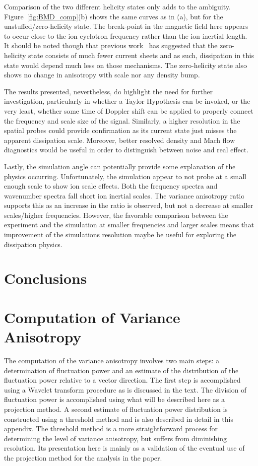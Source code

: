 \documentclass[aip,prl,amsmath,amssymb,reprint,superscriptaddress]{revtex4-1} %
\begin{document}
Comparison of the two different helicity states only adds to the ambiguity. Figure~\ref{fig:BMD_comp}(b) shows the same curves as in (a), but for the unstuffed/zero-helicity state. The break-point in the magnetic field here appears to occur close to the ion cyclotron frequency rather than the ion inertial length. It should be noted though that previous work~\cite{schaffner14b} has suggested that the zero-helicity state consists of much fewer current sheets and as such, dissipation in this state would depend much less on those mechanisms. The zero-helicity state also shows no change in anisotropy with scale nor any density bump.

The results presented, nevertheless, do highlight the need for further investigation, particularly in whether a Taylor Hypothesis can be invoked, or the very least, whether some time of Doppler shift can be applied to properly connect the frequency and scale size of the signal. Similarly, a higher resolution in the spatial probes could provide confirmation as its current state just misses the apparent dissipation scale. Moreover, better resolved density and Mach flow diagnostics would be useful in order to distinguish between noise and real effect.

Lastly, the simulation angle can potentially provide some explanation of the physics occurring. Unfortunately, the simulation appear to not probe at a small enough scale to show ion scale effects. Both the frequency spectra and wavenumber spectra fall short ion inertial scales. The variance anisotropy ratio supports this as an increase in the ratio is observed, but not a decrease at smaller scales/higher frequencies. However, the favorable comparison between the experiment and the simulation at smaller frequencies and larger scales means that improvement of the simulations resolution maybe be useful for exploring the dissipation physics.

\section{Conclusions}\label{sec:conclusions}

\appendix

\section{Computation of Variance Anisotropy}

The computation of the variance anisotropy involves two main steps: a determination of fluctuation power and an estimate of the distribution of the fluctuation power relative to a vector direction. The first step is accomplished using a Wavelet transform procedure as is discussed in the text. The division of fluctuation power is accomplished using what will be described here as a projection method. A second estimate of fluctuation power distribution is constructed using a threshold method and is also described in detail in this appendix. The threshold method is a more straightforward process for determining the level of variance anisotropy, but suffers from diminishing resolution. Its presentation here is mainly as a validation of the eventual use of the projection method for the analysis in the paper. 
\end{document}

